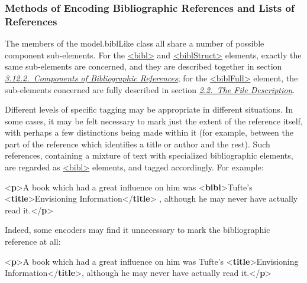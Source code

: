 \subsubsection[{Methods of Encoding Bibliographic References and Lists of References}]{Methods of Encoding Bibliographic References and Lists of References}\label{COBITY}\par
The members of the \textsf{model.biblLike} class all share a number of possible component sub-elements. For the \hyperref[TEI.bibl]{<bibl>} and \hyperref[TEI.biblStruct]{<biblStruct>} elements, exactly the same sub-elements are concerned, and they are described together in section \textit{\hyperref[COBICO]{3.12.2.\ Components of Bibliographic References}}; for the \hyperref[TEI.biblFull]{<biblFull>} element, the sub-elements concerned are fully described in section \textit{\hyperref[HD2]{2.2.\ The File Description}}.\par
Different levels of specific tagging may be appropriate in different situations. In some cases, it may be felt necessary to mark just the extent of the reference itself, with perhaps a few distinctions being made within it (for example, between the part of the reference which identifies a title or author and the rest). Such references, containing a mixture of text with specialized bibliographic elements, are regarded as \hyperref[TEI.bibl]{<bibl>} elements, and tagged accordingly. For example: \par\bgroup{}\exampleFont \begin{shaded}\noindent\mbox{}{<\textbf{p}>}A book which had a great influence on him\mbox{}\newline 
 was {<\textbf{bibl}>}Tufte's {<\textbf{title}>}Envisioning\mbox{}\newline 
\hspace*{1em}\hspace*{1em}\hspace*{1em}\hspace*{1em} Information{</\textbf{title}>}\mbox{}\newline 
{}, although he may\mbox{}\newline 
 never have actually read it.{</\textbf{p}>}\end{shaded}\egroup\par \noindent  Indeed, some encoders may find it unnecessary to mark the bibliographic reference at all: \par\bgroup{}\exampleFont \begin{shaded}\noindent\mbox{}{<\textbf{p}>}A book which had a great influence on him\mbox{}\newline 
 was Tufte's {<\textbf{title}>}Envisioning Information{</\textbf{title}>},\mbox{}\newline 
 although he may never have actually read it.{</\textbf{p}>}\end{shaded}\egroup\par \par
